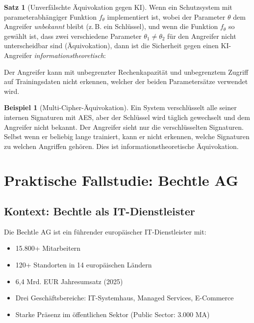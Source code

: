 \documentclass[a4paper,12pt]{article}
\theoremstyle{definition}
\newtheorem{beispiel}{Beispiel}
\newtheorem{satz}{Satz}
\begin{document}
\begin{satz}[Unverfälschte Äquivokation gegen KI]
\label{satz:aequivokation_sicherheit}
Wenn ein Schutzsystem mit parameterabhängiger Funktion $f_\theta$ implementiert ist, wobei der Parameter $\theta$ dem Angreifer \emph{unbekannt} bleibt (z.\,B. ein Schlüssel), und wenn die Funktion $f_\theta$ so gewählt ist, dass zwei verschiedene Parameter $\theta_1 \neq \theta_2$ für den Angreifer nicht unterscheidbar sind (Äquivokation), dann ist die Sicherheit gegen einen KI-Angreifer \emph{informationstheoretisch}:

Der Angreifer kann mit unbegrenzter Rechenkapazität und unbegrenztem Zugriff auf Trainingsdaten nicht erkennen, welcher der beiden Parametersätze verwendet wird.
\end{satz}

\begin{beispiel}[Multi-Cipher-Äquivokation]
Ein System verschlüsselt alle seiner internen Signaturen mit AES, aber der Schlüssel wird täglich gewechselt und dem Angreifer nicht bekannt. Der Angreifer sieht nur die verschlüsselten Signaturen. Selbst wenn er beliebig lange trainiert, kann er nicht erkennen, welche Signaturen zu welchen Angriffen gehören. Dies ist informationstheoretische Äquivokation.
\end{beispiel}

\section{Praktische Fallstudie: Bechtle AG}

\subsection{Kontext: Bechtle als IT-Dienstleister}

Die Bechtle AG ist ein führender europäischer IT-Dienstleister mit:
\begin{itemize}
	\item 15.800+ Mitarbeitern
	\item 120+ Standorten in 14 europäischen Ländern
	\item 6,4 Mrd. EUR Jahresumsatz (2025)
	\item Drei Geschäftsbereiche: IT-Systemhaus, Managed Services, E-Commerce
	\item Starke Präsenz im öffentlichen Sektor (Public Sector: 3.000 MA)
\end{itemize}
\end{document}

